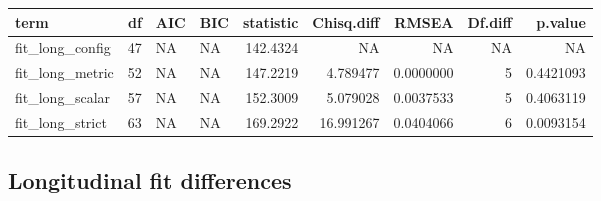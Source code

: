 \documentclass[
  letterpaper,
  DIV=11,
  numbers=noendperiod]{scrreprt}
\begin{document}
\begin{tabular}[t]{l|r|l|l|r|r|r|r|r}
\hline
term & df & AIC & BIC & statistic & Chisq.diff & RMSEA & Df.diff & p.value\\
\hline
fit\_long\_config & 47 & NA & NA & 142.4324 & NA & NA & NA & NA\\
\hline
fit\_long\_metric & 52 & NA & NA & 147.2219 & 4.789477 & 0.0000000 & 5 & 0.4421093\\
\hline
fit\_long\_scalar & 57 & NA & NA & 152.3009 & 5.079028 & 0.0037533 & 5 & 0.4063119\\
\hline
fit\_long\_strict & 63 & NA & NA & 169.2922 & 16.991267 & 0.0404066 & 6 & 0.0093154\\
\hline
\end{tabular}

\hypertarget{longitudinal-fit-differences}{%
\subsection{Longitudinal fit
differences}\label{longitudinal-fit-differences}}
\end{document}
